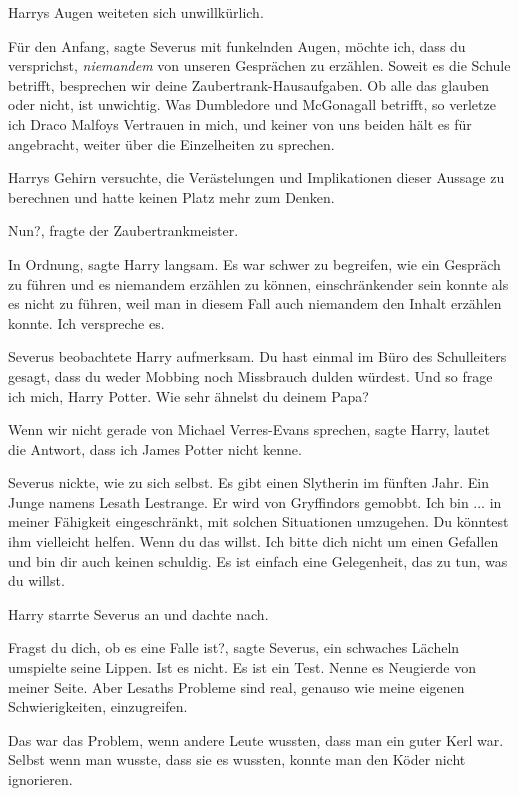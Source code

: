 Harrys Augen weiteten sich unwillkürlich.

\glqq{}Für den Anfang\grqq{}, sagte Severus mit funkelnden Augen, \glqq{}möchte
ich, dass du versprichst, \emph{niemandem} von unseren Gesprächen zu erzählen.
Soweit es die Schule betrifft, besprechen wir deine Zaubertrank-Hausaufgaben. Ob
alle das glauben oder nicht, ist unwichtig. Was Dumbledore und McGonagall
betrifft, so verletze ich Draco Malfoys Vertrauen in mich, und keiner von uns
beiden hält es für angebracht, weiter über die Einzelheiten zu sprechen.\grqq{}

Harrys Gehirn versuchte, die Verästelungen und Implikationen dieser Aussage zu
berechnen und hatte keinen Platz mehr zum Denken.

\glqq{}Nun?\grqq{}, fragte der Zaubertrankmeister.

\glqq{}In Ordnung\grqq{}, sagte Harry langsam. Es war schwer zu begreifen, wie
ein Gespräch zu führen und es niemandem erzählen zu können, einschränkender sein
konnte als es nicht zu führen, weil man in diesem Fall auch niemandem den Inhalt
erzählen konnte. \glqq{}Ich verspreche es.\grqq{}

Severus beobachtete Harry aufmerksam. \glqq{}Du hast einmal im Büro des
Schulleiters gesagt, dass du weder Mobbing noch Missbrauch dulden würdest. Und
so frage ich mich, Harry Potter. Wie sehr ähnelst du deinem Papa?\grqq{}

\glqq{}Wenn wir nicht gerade von Michael Verres-Evans sprechen\grqq{}, sagte
Harry, \glqq{}lautet die Antwort, dass ich James Potter nicht kenne.\grqq{}

Severus nickte, wie zu sich selbst. \glqq{}Es gibt einen Slytherin im fünften
Jahr. Ein Junge namens Lesath Lestrange. Er wird von Gryffindors gemobbt. Ich
bin ... in meiner Fähigkeit eingeschränkt, mit solchen Situationen umzugehen. Du
könntest ihm vielleicht helfen. Wenn du das willst. Ich bitte dich nicht um
einen Gefallen und bin dir auch keinen schuldig. Es ist einfach eine
Gelegenheit, das zu tun, was du willst.\grqq{}

Harry starrte Severus an und dachte nach.

\glqq{}Fragst du dich, ob es eine Falle ist?\grqq{}, sagte Severus, ein
schwaches Lächeln umspielte seine Lippen. \glqq{}Ist es nicht. Es ist ein Test.
Nenne es Neugierde von meiner Seite. Aber Lesaths Probleme sind real, genauso
wie meine eigenen Schwierigkeiten, einzugreifen.\grqq{}

Das war das Problem, wenn andere Leute wussten, dass man ein guter Kerl war.
Selbst wenn man wusste, dass sie es wussten, konnte man den Köder nicht
ignorieren.

